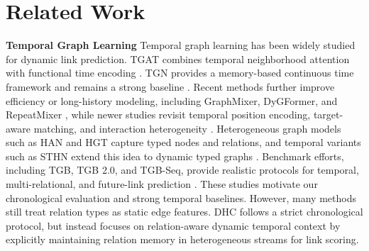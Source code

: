 
\section{Related Work}
\textbf{Temporal Graph Learning}
Temporal graph learning has been widely studied for dynamic link prediction. 
TGAT combines temporal neighborhood attention with functional time encoding \cite{xu2020tgat}. 
TGN provides a memory-based continuous time framework and remains a strong baseline \cite{rossi2020tgn}. 
Recent methods further improve efficiency or long-history modeling, including GraphMixer, DyGFormer, and RepeatMixer \cite{cong2023graphmixer,yu2023dygformer,zou2024repeatmixer}, 
while newer studies revisit temporal position encoding, target-aware matching, and interaction heterogeneity \cite{cheng2025scalability,tieu2025learnable,yi2026future,yu2026tami}. 
Heterogeneous graph models such as HAN and HGT capture typed nodes and relations, and temporal variants such as STHN extend this idea to dynamic typed graphs \cite{wang2019heterogeneous,hu2020hgt,li2023sthn,yue2025heterogeneous}. 
Benchmark efforts, including TGB, TGB 2.0, and TGB-Seq, provide realistic protocols for temporal, multi-relational, and future-link prediction \cite{huang2023tgb,gastinger2024tgb2,yi2025tgbseq}. 
These studies motivate our chronological evaluation and strong temporal baselines. However, many methods still treat relation types as static edge features. 
DHC follows a strict chronological protocol, but instead focuses on relation-aware dynamic temporal context by explicitly maintaining relation memory in heterogeneous streams for link scoring.


